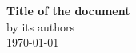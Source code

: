 \documentclass[a4paper,10pt,openany,oneside]{report}
\begin{document}

\thispagestyle{empty}
\vspace*{3cm}
\begin{center}
\textbf{\Huge{Title of the document}} \\[1cm]
{\Large by its authors} \\[5cm]
\today
\end{center}
\pagebreak
\setcounter{page}{0}

\end{document}
